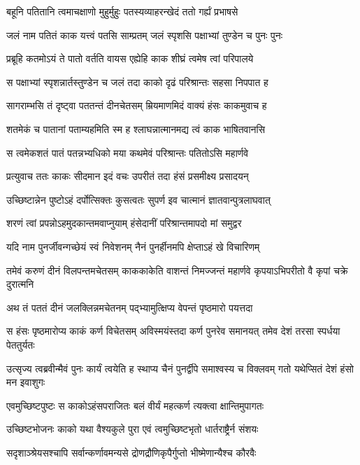 \twolineshloka
{बहूनि पतितानि त्वमाचक्षाणो मुहुर्मुहुः}
{पतस्यव्याहरन्खेदं ततो गर्ह्यं प्रभाषसे}


\twolineshloka
{जलं नाम पतितं काक यत्त्वं पतसि साम्प्रतम्}
{जलं स्पृशसि पक्षाभ्यां तुण्डेन च पुनः पुनः}


\twolineshloka
{प्रब्रूहि कतमोऽयं ते पातो वर्तति वायस}
{एह्येहि काक शीघ्रं त्वमेष त्वां परिपालये}


\twolineshloka
{स पक्षाभ्यां स्पृशन्नार्तस्तुण्डेन च जलं तदा}
{काको दृढं परिश्रान्तः सहसा निपपात ह}


\twolineshloka
{सागराम्भसि तं दृष्ट्वा पततन्तं दीनचेतसम्}
{म्रियमाणमिदं वाक्यं हंसः काकमुवाच ह}


\twolineshloka
{शतमेकं च पातानां पताम्यहमिति स्म ह}
{श्लाघन्नात्मानमद्य त्वं काक भाषितवानसि}


\twolineshloka
{स त्वमेकशतं पातं पतन्नभ्यधिको मया}
{कथमेवं परिश्रान्तः पतितोऽसि महार्णवे}


\twolineshloka
{प्रत्युवाच ततः काकः सीदमान इदं वचः}
{उपरीतं तदा हंसं प्रसमीक्ष्य प्रसादयन्}


\twolineshloka
{उच्छिष्टान्नेन पुष्टोऽहं दर्पोत्सिक्तः कुसत्वतः}
{सुपर्ण इव चात्मानं ज्ञातवान्पुत्रलाघवात्}


\twolineshloka
{शरणं त्वां प्रपन्नोऽहमुदकान्तमवाप्नुयाम्}
{हंसेदानीं परिश्रान्तमापदो मां समुद्वर}


\twolineshloka
{यदि नाम पुनर्जीवन्गच्छेयं स्वं निवेशनम्}
{नैनं पुनर्हीनमपि क्षेप्ताऽहं खे विचारिणम्}


\threelineshloka
{तमेवं करुणं दीनं विलपन्तमचेतसम्}
{काककाकेति वाशन्तं निमज्जन्तं महार्णवे}
{कृपयाऽभिपरीतो वै कृपां चक्रे दुरात्मनि}


\twolineshloka
{अथ तं पततं दीनं जलक्लिन्नमचेतनम्}
{पद्भ्यामुत्क्षिप्य वेपन्तं पृष्ठमारो पयत्तदा}


\threelineshloka
{स हंसः पृष्ठमारोप्य काकं कर्ण विचेतसम्}
{अविस्मयंस्तदा कर्ण पुनरेव समानयत्}
{तमेव देशं तरसा स्पर्धया पेततुर्यतः}


\threelineshloka
{उत्सृज्य त्वब्रवीन्मैवं पुनः कार्यं त्वयेति ह}
{स्थाप्य चैनं पुनर्द्वीपे समाश्वस्य च विक्लवम्}
{गतो यथेप्सितं देशं हंसो मन इवाशुगः}


\twolineshloka
{एवमुच्छिष्टपुष्टः स काकोऽहंसपराजितः}
{बलं वीर्यं महत्कर्ण त्यक्त्वा क्षान्तिमुपागतः}


\twolineshloka
{उच्छिष्टभोजनः काको यथा वैश्यकुले पुरा}
{एवं त्वमुच्छिष्टभृतो धार्तराष्ट्रैर्न संशयः}


\twolineshloka
{सदृशाञ्श्रेयसश्चापि सर्वान्कर्णावमन्यसे}
{द्रोणद्रौणिकृपैर्गुप्तो भीष्मेणान्यैश्च कौरवैः}


